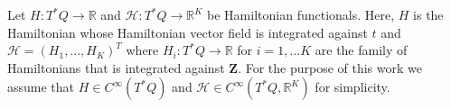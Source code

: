 \documentclass[11pt, oneside]{article}
\numberwithin{equation}{section}
\theoremstyle{definition}
\newcommand{\mc}[1]{\mathcal{#1}}
\newcommand{\mcal}[1]{\mc{#1}}
\begin{document}
Let $H :T^*Q \rightarrow \mathbb{R}$ and $\mcal{H} :T^*Q \rightarrow \mathbb{R}^K$ be Hamiltonian functionals. Here, $H$ is the Hamiltonian whose Hamiltonian vector field is integrated against $t$ and $\mcal{H} = (H_1,\ldots, H_K)^T$ where $H_i :T^*Q \rightarrow \mathbb{R}$ for $i = 1,\ldots K$ are the family of Hamiltonians that is integrated against $\mathbf{Z}$. For the purpose of this work we assume that $H \in C^\infty(T^*Q)$ and $\mcal{H} \in C^\infty(T^*Q, \mathbb{R}^K)$ for simplicity.

\end{document}
